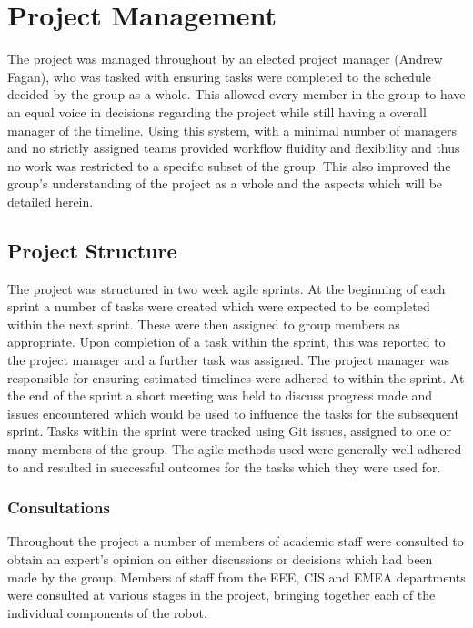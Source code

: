 \chapter{Project Management}\label{pm}

The project was managed throughout by an elected project manager 
(Andrew Fagan), who was tasked with ensuring tasks were 
completed to the schedule decided by the group as a whole. This 
allowed every member in the group to have an equal voice in 
decisions regarding the project while still having a overall 
manager of the timeline. Using this system, with a minimal 
number of managers and no strictly assigned teams provided
workflow fluidity and flexibility and thus no work was restricted 
to a specific subset of the group. This also improved the 
group's understanding of the project as a whole and the aspects 
which will be detailed herein. 

\section{Project Structure}\label{pm/structure}

The project was structured in two week agile sprints. At the 
beginning of each sprint a number of tasks were created which 
were expected to be completed within the next sprint. These were 
then assigned to group members as appropriate. Upon completion 
of a task within the sprint, this was reported to the project 
manager and a further task was assigned. The project manager was 
responsible for ensuring estimated timelines were adhered to 
within the sprint. At the end of the sprint a short meeting was 
held to discuss progress made and issues encountered which would 
be used to influence the tasks for the subsequent sprint. Tasks 
within the sprint were tracked using Git issues, assigned to one 
or many members of the group. The agile methods used were 
generally well adhered to and 
resulted in successful outcomes for the tasks which they were 
used for. 
	

\subsection{Consultations}\label{pm/consultations}
Throughout the project a number of members of academic staff 
were consulted to obtain an expert's opinion on either 
discussions or decisions which had been made by the group. 
Members of staff from the EEE, CIS and EMEA departments were 
consulted at various stages in the project, bringing together 
each of the individual components of the robot. 

